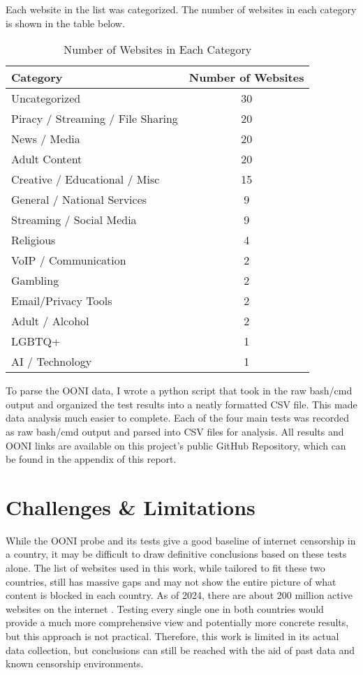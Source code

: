 Each website in the list was categorized. The number of websites in each category is shown in the table below.

\begin{table}[H]
\centering
\caption{Number of Websites in Each Category}
\begin{tabular}{lc}
\toprule
\textbf{Category} & \textbf{Number of Websites} \\
\midrule
Uncategorized & 30 \\
Piracy / Streaming / File Sharing & 20 \\
News / Media & 20 \\
Adult Content & 20 \\
Creative / Educational / Misc & 15 \\
General / National Services & 9 \\
Streaming / Social Media & 9 \\
Religious & 4 \\
VoIP / Communication & 2 \\
Gambling & 2 \\
Email/Privacy Tools & 2 \\
Adult / Alcohol & 2 \\
LGBTQ+ & 1 \\
AI / Technology & 1 \\
\bottomrule
\end{tabular}
\label{tab:website_category_amount}
\end{table}

To parse the OONI data, I wrote a python script that took in the raw bash/cmd output and organized the test results into a neatly formatted CSV file. This made data analysis much easier to complete. Each of the four main tests was recorded as raw bash/cmd output and parsed into CSV files for analysis. All results and OONI links are available on this project's public GitHub Repository, which can be found in the appendix of this report.

\section{Challenges \& Limitations}

While the OONI probe and its tests give a good baseline of internet censorship in a country, it may be difficult to draw definitive conclusions based on these tests alone. The list of websites used in this work, while tailored to fit these two countries, still has massive gaps and may not show the entire picture of what content is blocked in each country. As of 2024, there are about 200 million active websites on the internet \cite{digitalsilkManyWebsites}. Testing every single one in both countries would provide a much more comprehensive view and potentially more concrete results, but this approach is not practical. Therefore, this work is limited in its actual data collection, but conclusions can still be reached with the aid of past data and known censorship environments.


